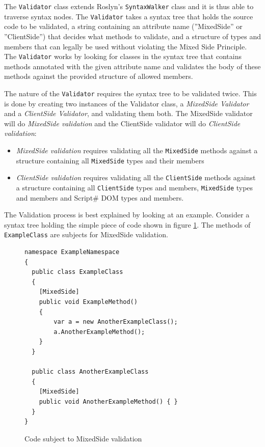 The \texttt{Validator} class extends Roslyn's \texttt{SyntaxWalker} class and it is thus able to traverse syntax nodes. The \texttt{Validator} takes a syntax tree that holds the source code to be validated, a string containing an attribute name (''MixedSide'' or ''ClientSide'') that decides what methods to validate, and a structure of types and members that can legally be used without violating the Mixed Side Principle. The \texttt{Validator} works by looking for classes in the syntax tree that contains methods annotated with the given attribute name and validates the body of these methods against the provided structure of allowed members.

The nature of the \texttt{Validator} requires the syntax tree to be validated twice. This is done by creating two instances of the Validator class, a \emph{MixedSide Validator} and a \emph{ClientSide Validator}, and validating them both. 
The MixedSide validator will do \emph{MixedSide validation} and the ClientSide validator will do \emph{ClientSide validation}:

\begin{itemize}
	\item \emph{MixedSide validation} requires validating all the \texttt{MixedSide} methods against a structure containing all \texttt{MixedSide} types and their members
	\item \emph{ClientSide validation} requires validating all the \texttt{ClientSide} methods against a structure containing all \texttt{ClientSide} types and members, \texttt{MixedSide} types and members and Script\# DOM types and members.
\end{itemize}


The Validation process is best explained by looking at an example. Consider a syntax tree holding the simple piece of code shown in figure \ref{fig:mixedSideValidationExample}. The methods of \texttt{ExampleClass} are subjects for MixedSide validation.

\begin{figure}[H]
	\begin{lstlisting}[language=CSharp,classoffset=1,morekeywords={ExampleClass,AnotherExampleClass,MixedSide}]
namespace ExampleNamespace
{
  public class ExampleClass
  {
  	[MixedSide]
  	public void ExampleMethod()
  	{
  		var a = new AnotherExampleClass();
  		a.AnotherExampleMethod();
  	}
  }
  
  public class AnotherExampleClass
  {
  	[MixedSide]
  	public void AnotherExampleMethod() { }
  }
}
	\end{lstlisting}
	\caption{Code subject to MixedSide validation}
	\label{fig:mixedSideValidationExample}
\end{figure}		

